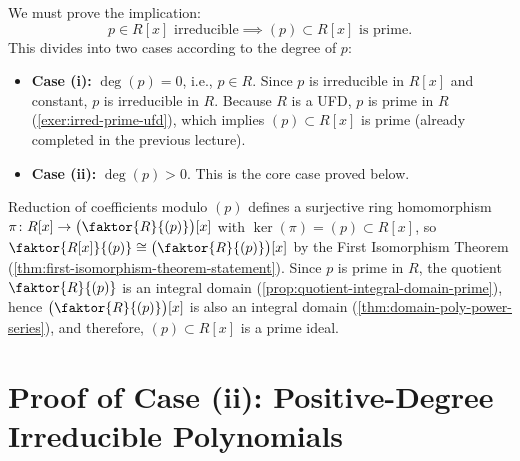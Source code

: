 \begin{content}
We must prove the implication:
\begin{equation}\label{eq:irred-implies-prime}
p \in R[x] \text{ irreducible} \implies (p) \subset R[x] \text{ is prime}.
\end{equation}
This divides into two cases according to the degree of $p$:
\begin{itemize}
    \item \textbf{Case (i):} $\deg(p) = 0$, i.e., $p \in R$. Since $p$ is irreducible in $R[x]$ and constant, $p$ is irreducible in $R$. Because $R$ is a UFD, $p$ is prime in $R$ (\cref{exer:irred-prime-ufd}), which implies $(p) \subset R[x]$ is prime (already completed in the previous lecture).
    \item \textbf{Case (ii):} $\deg(p) > 0$. This is the core case proved below.
\end{itemize}
\end{content}

\begin{aiNote}
Reduction of coefficients modulo $(p)$ defines a surjective ring homomorphism $\pi \colon R[x] \to \bigl(\faktor{R}{(p)}\bigr)[x]$ with $\ker(\pi) = (p) \subset R[x]$, so $\faktor{R[x]}{(p)} \cong \bigl(\faktor{R}{(p)}\bigr)[x]$ by the First Isomorphism Theorem (\cref{thm:first-isomorphism-theorem-statement}). Since $p$ is prime in $R$, the quotient $\faktor{R}{(p)}$ is an integral domain (\cref{prop:quotient-integral-domain-prime}), hence $\bigl(\faktor{R}{(p)}\bigr)[x]$ is also an integral domain (\cref{thm:domain-poly-power-series}), and therefore, $(p) \subset R[x]$ is a prime ideal.
\end{aiNote}

\section{Proof of Case (ii): Positive-Degree Irreducible Polynomials}

